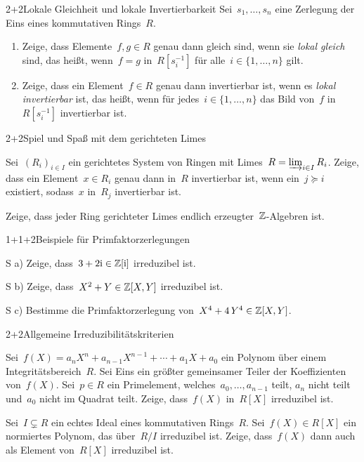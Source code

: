 \documentclass{algblatt}
\begin{document}

\begin{aufgabe}{2+2}{Lokale Gleichheit und lokale Invertierbarkeit}
Sei~$s_1,\ldots,s_n$ eine Zerlegung der Eins eines kommutativen Rings~$R$.
\begin{enumerate}
\item Zeige, dass Elemente~$f, g \in R$ genau dann gleich sind, wenn sie
\emph{lokal gleich} sind, das heißt, wenn~$f = g$ in~$R[s_i^{-1}]$ für alle~$i
\in \{ 1,\ldots, n \}$ gilt.
\item Zeige, dass ein Element~$f \in R$ genau dann invertierbar ist, wenn es
\emph{lokal invertierbar} ist, das heißt, wenn für jedes~$i \in
\{1,\ldots,n\}$ das Bild von~$f$ in~$R[s_i^{-1}]$ invertierbar ist.
\end{enumerate}
\end{aufgabe}

\begin{aufgabeE}{2+2}{Spiel und Spaß mit dem gerichteten Limes}
\item Sei~$(R_i)_{i \in I}$ ein gerichtetes System von Ringen mit Limes~$R =
\varinjlim_{i \in I} R_i$. Zeige, dass ein Element~$x \in R_i$ genau dann
in~$R$ invertierbar ist, wenn ein~$j \succeq i$ existiert, sodass~$x$ in~$R_j$
invertierbar ist.

\item Zeige, dass jeder Ring gerichteter Limes endlich erzeugter~$\mathbb{Z}$-Algebren
ist.
\end{aufgabeE}

\begin{aufgabeE}{1+1+2}{Beispiele für Primfaktorzerlegungen}
\item[S a)] Zeige, dass~$3 + 2\mathrm{i} \in \mathbb{Z}[\mathrm{i}]$ irreduzibel ist.
\item[S b)] Zeige, dass~$X^2 + Y \in \mathbb{Z}[X,Y]$ irreduzibel ist.
\item[S c)] Bestimme die Primfaktorzerlegung von~$X^4 + 4\,Y^4 \in \mathbb{Z}[X,Y]$.
\end{aufgabeE}

\begin{aufgabeE}{2+2}{Allgemeine Irreduzibilitätskriterien}
\item Sei~$f(X) = a_n X^n + a_{n-1} X^{n-1} + \cdots + a_1 X + a_0$ ein Polynom
über einem Integritätsbereich~$R$. Sei Eins ein größter gemeinsamer Teiler der
Koeffizienten von~$f(X)$. Sei~$p \in R$ ein Primelement,
welches~$a_0,\ldots,a_{n-1}$ teilt, $a_n$ nicht teilt und~$a_0$ nicht im
Quadrat teilt. Zeige, dass~$f(X)$ in~$R[X]$ irreduzibel ist.
\item Sei~$I \subsetneq R$ ein echtes Ideal eines kommutativen Rings~$R$.
Sei~$f(X) \in R[X]$ ein normiertes Polynom, das über~$R/I$ irreduzibel ist.
Zeige, dass~$f(X)$ dann auch als Element von~$R[X]$ irreduzibel ist.
\end{aufgabeE}
\end{document}
